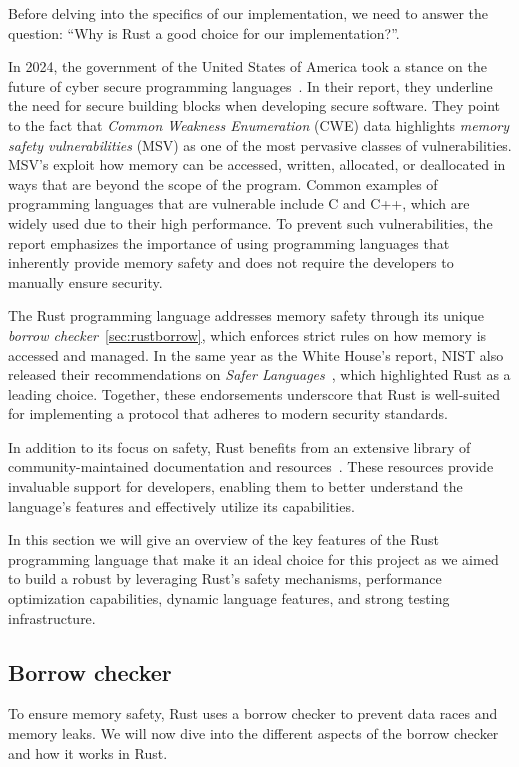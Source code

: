 \documentclass[twoside,11pt]{report}
\theoremstyle{definition}
\theoremstyle{plain}
\begin{document}
Before delving into the specifics of our implementation, we need to answer the question: ``Why is Rust a good choice for our implementation?''.

In 2024, the government of the United States of America took a stance on the future of cyber secure programming languages~\cite{whitehouse2024memorysafe}. In their report, they underline the need for secure building blocks when developing secure software. They point to the fact that \textit{Common Weakness Enumeration} (CWE) data highlights \textit{memory safety vulnerabilities} (MSV) as one of the most pervasive classes of vulnerabilities. MSV's exploit how memory can be accessed, written, allocated, or deallocated in ways that are beyond the scope of the program. Common examples of programming languages that are vulnerable include C and C++, which are widely used due to their high performance. To prevent such vulnerabilities, the report emphasizes the importance of using programming languages that inherently provide memory safety and does not require the developers to manually ensure security.

The Rust programming language addresses memory safety through its unique \textit{borrow checker}~\autoref{sec:rustborrow}, which enforces strict rules on how memory is accessed and managed. In the same year as the White House's report, NIST also released their recommendations on \textit{Safer Languages}~\cite{nistsaferlanguages}, which highlighted Rust as a leading choice. Together, these endorsements underscore that Rust is well-suited for implementing a protocol that adheres to modern security standards.

In addition to its focus on safety, Rust benefits from an extensive library of community-maintained documentation and resources~\cite{rustlangRustProgramming,rustlangPerformanceBook,lurklurkEffectiveRust}. These resources provide invaluable support for developers, enabling them to better understand the language's features and effectively utilize its capabilities.

In this section we will give an overview of the key features of the Rust programming language that make it an ideal choice for this project as we aimed to build a robust by leveraging Rust's safety mechanisms, performance optimization capabilities, dynamic language features, and strong testing infrastructure.

\subsection{Borrow checker}\label{sec:rustborrow} %
To ensure memory safety, Rust uses a borrow checker to prevent data races and memory leaks. We will now dive into the different aspects of the borrow checker and how it works in Rust.
\end{document}
